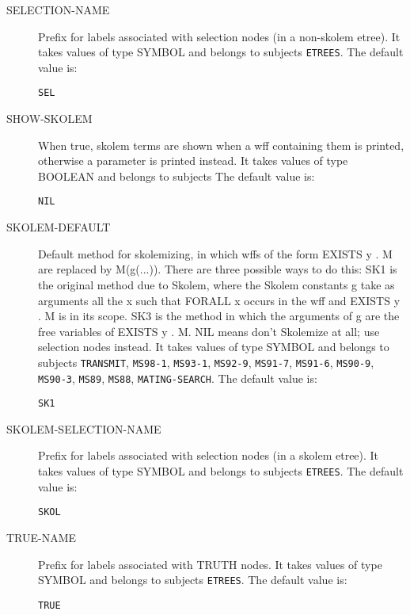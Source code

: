 \begin{description}
\item[SELECTION-NAME]  
Prefix for labels associated with selection nodes (in a 
non-skolem etree).
It takes values of type SYMBOL and belongs to subjects \texttt{ETREES}.  The default value is: \begin{lstlisting}
SEL
\end{lstlisting}

\item[SHOW-SKOLEM]  
When true, skolem terms are shown when a wff containing them
is printed, otherwise a parameter is printed instead.
It takes values of type BOOLEAN and belongs to subjects The default value is: \begin{lstlisting}
NIL
\end{lstlisting}

\item[SKOLEM-DEFAULT]  
Default method for skolemizing, in which wffs of the form
EXISTS y . M are replaced by M(g(...)). There are three possible ways to
do this:
SK1 is the original method due to Skolem, where the Skolem constants
 g take as arguments all the x such that FORALL x occurs in the wff 
 and EXISTS y . M is in its scope.
SK3 is the method in which the arguments of g are the free variables
 of EXISTS y . M.
NIL means don't Skolemize at all; use selection nodes instead.
It takes values of type SYMBOL and belongs to subjects \texttt{TRANSMIT}, \texttt{MS98-1}, \texttt{MS93-1}, \texttt{MS92-9}, \texttt{MS91-7}, \texttt{MS91-6}, \texttt{MS90-9}, \texttt{MS90-3}, \texttt{MS89}, \texttt{MS88}, \texttt{MATING-SEARCH}.  The default value is: \begin{lstlisting}
SK1
\end{lstlisting}

\item[SKOLEM-SELECTION-NAME]  
Prefix for labels associated with selection nodes (in a 
skolem etree).
It takes values of type SYMBOL and belongs to subjects \texttt{ETREES}.  The default value is: \begin{lstlisting}
SKOL
\end{lstlisting}

\item[TRUE-NAME]  
Prefix for labels associated with TRUTH nodes.
It takes values of type SYMBOL and belongs to subjects \texttt{ETREES}.  The default value is: \begin{lstlisting}
TRUE
\end{lstlisting}


\end{description}
